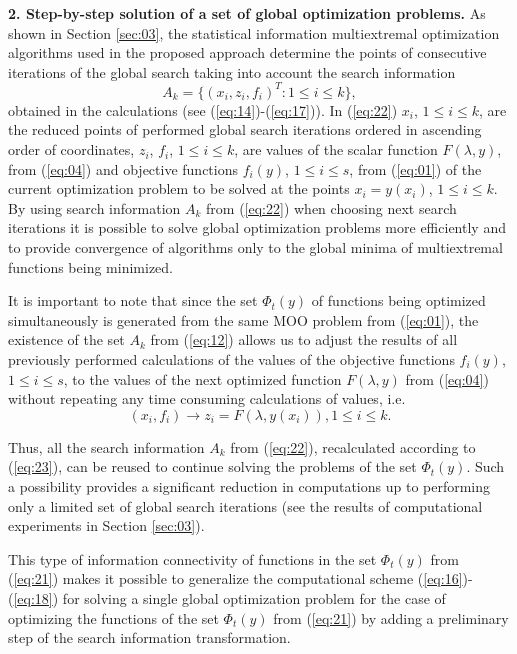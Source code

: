 \documentclass[runningheads]{llncs}
\begin{document}
\textbf{2. Step-by-step solution of a set of global optimization problems.} As shown in Section \ref{sec:03}, the statistical information multiextremal optimization algorithms used in the proposed approach determine the points of consecutive iterations of the global search taking into account the search information
\begin{equation}
\label{eq:22}
A_k=\{(x_i,z_i,f_i )^T:1 \leq i \leq k\},
\end{equation}
obtained in the calculations (see (\ref{eq:14})-(\ref{eq:17})). In (\ref{eq:22}) $x_i$, $1 \leq i \leq k$,  are the reduced points of performed global search iterations ordered in ascending order of coordinates,  $z_i$, $f_i$, $1 \leq i \leq k$, are values of the scalar function $F(\lambda, y)$, from (\ref{eq:04}) and objective functions $f_i(y)$, $1 \leq i \leq s$, from (\ref{eq:01}) of the current optimization problem to be solved at the points $x_i=y(x_i)$, $1 \leq i \leq k$. By using search information $A_k$ from (\ref{eq:22}) when choosing next search iterations it is possible to solve global optimization problems more efficiently and to provide convergence of algorithms only to the global minima of multiextremal functions being minimized.

It is important to note that since the set $\Phi_t(y)$ of functions being optimized  simultaneously is generated from the same MOO problem from (\ref{eq:01}), the existence of the set $A_k$ from (\ref{eq:12}) allows us to adjust the results of all previously performed calculations of the values of the objective functions $f_i(y)$, $1 \leq i \leq s$, to the values of the next optimized function $F(\lambda, y)$ from (\ref{eq:04}) without repeating any time consuming calculations of values, i.e.
\begin{equation}
\label{eq:23}
(x_i,f_i ) \to z_i=F(\lambda, y(x_i)) ,1 \leq i \leq k.
\end{equation}

Thus, all the search information $A_k$ from (\ref{eq:22}), recalculated according to (\ref{eq:23}), can be reused to continue solving the problems of the set $\Phi_t(y)$. Such a possibility provides a significant reduction in computations up to performing only a limited set of global search iterations (see the results of computational experiments in Section \ref{sec:03}).

     This type of information connectivity of functions in the set $\Phi_t(y)$ from (\ref{eq:21}) makes it possible to generalize the computational scheme (\ref{eq:16})-(\ref{eq:18}) for solving a single global optimization problem for the case of optimizing the functions of the set $\Phi_t(y)$ from (\ref{eq:21}) by adding a preliminary step of the search information  transformation.
\end{document}

